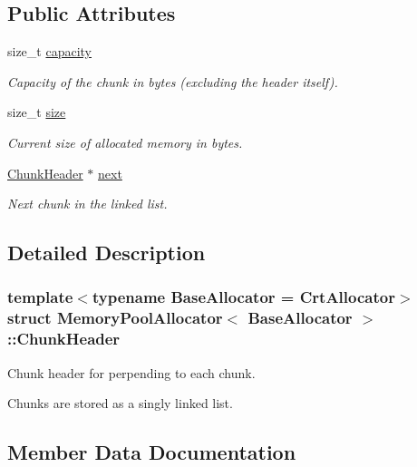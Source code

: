 \subsection*{Public Attributes}
\begin{DoxyCompactItemize}
\item 
size\+\_\+t \hyperlink{structMemoryPoolAllocator_1_1ChunkHeader_ae19df98bce5dd485a23f953112ecde5f}{capacity}
\begin{DoxyCompactList}\small\item\em Capacity of the chunk in bytes (excluding the header itself). \end{DoxyCompactList}\item 
size\+\_\+t \hyperlink{structMemoryPoolAllocator_1_1ChunkHeader_ac9f3868f4cd36cdb7c712c9a48686680}{size}
\begin{DoxyCompactList}\small\item\em Current size of allocated memory in bytes. \end{DoxyCompactList}\item 
\hyperlink{structMemoryPoolAllocator_1_1ChunkHeader}{Chunk\+Header} $\ast$ \hyperlink{structMemoryPoolAllocator_1_1ChunkHeader_a4d24357c177824b3af56ec1098d9d9dc}{next}
\begin{DoxyCompactList}\small\item\em Next chunk in the linked list. \end{DoxyCompactList}\end{DoxyCompactItemize}


\subsection{Detailed Description}
\subsubsection*{template$<$typename Base\+Allocator = Crt\+Allocator$>$\newline
struct Memory\+Pool\+Allocator$<$ Base\+Allocator $>$\+::\+Chunk\+Header}

Chunk header for perpending to each chunk. 

Chunks are stored as a singly linked list. 

\subsection{Member Data Documentation}
\mbox{\label{structMemoryPoolAllocator_1_1ChunkHeader_ae19df98bce5dd485a23f953112ecde5f}} 
